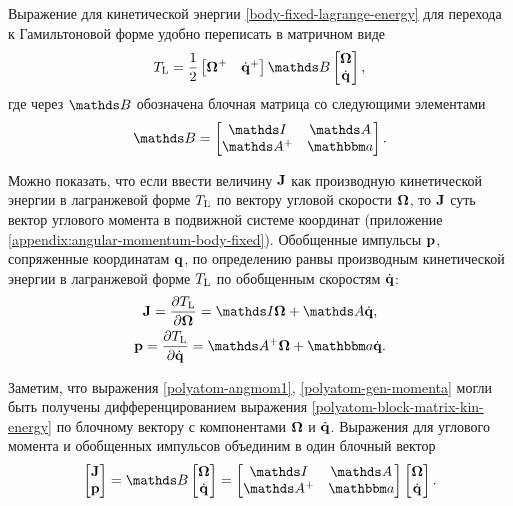 Выражение для кинетической энергии \eqref{body-fixed-lagrange-energy} для перехода к Гамильтоновой форме удобно переписать в матричном виде
\begin{gather}
    \Tl = \frac{1}{2} \begin{bmatrix} \bOmega^+ & \dot{\mf{q}}^+ \end{bmatrix} \bbB \begin{bmatrix} \bOmega \\ \dot{\mf{q}} \end{bmatrix}, \label{polyatom-block-matrix-kin-energy}
\end{gather}
%
где через $\bbB$ обозначена блочная матрица со следующими элементами 
\begin{gather}
    \bbB = \begin{bmatrix} 
    \bbI & \bbA \\ \bbA^+ & \bba 
    \end{bmatrix}.
\end{gather}

Можно показать, что если ввести величину $\mathbf{J}$ как производную кинетической энергии в лагранжевой форме $T_\text{L}$ по вектору угловой скорости $\boldsymbol{\Omega}$, то $\mathbf{J}$ суть вектор углового момента в подвижной системе координат (приложение \ref{appendix:angular-momentum-body-fixed}). Обобщенные импульсы $\mathbf{p}$, сопряженные координатам $\mathbf{q}$, по определению ранвы производным кинетической энергии в лагранжевой форме $T_\text{L}$ по обобщенным скоростям $\dot{\mathbf{q}}$: 
\begin{gather}
    \mf{J} = \frac{\partial \Tl}{\partial \bOmega} = \bbI \bOmega + \bbA \dot{\mf{q}}, \label{polyatom-angmom1} \\
\mf{p} = \frac{\partial \Tl}{\partial \dot{\mf{q}}} = \bbA^+ \bOmega + \bba \dot{\mf{q}} \label{polyatom-gen-momenta}.
\end{gather}

Заметим, что выражения \eqref{polyatom-angmom1}, \eqref{polyatom-gen-momenta} могли быть получены дифференцированием выражения  \eqref{polyatom-block-matrix-kin-energy} по блочному вектору с компонентами $\boldsymbol{\Omega}$ и $\dot{\mathbf{q}}$. Выражения для углового момента и обобщенных импульсов объединим в один блочный вектор
\begin{gather}
    \begin{bmatrix} \mf{J} \\ \mf{p} \end{bmatrix} = \bbB \begin{bmatrix} \bOmega \\ \dot{\mf{q}} \end{bmatrix} = 
    \begin{bmatrix} \bbI & \bbA \\ \bbA^+ & \bba \end{bmatrix} \begin{bmatrix} \bOmega \\ \dot{\mf{q}} \end{bmatrix}.
\end{gather}

